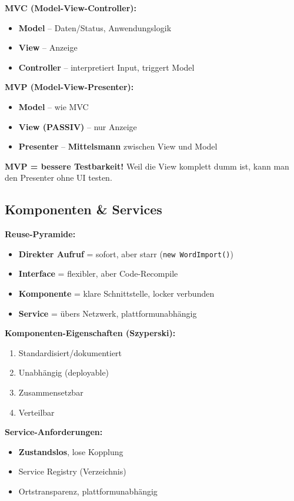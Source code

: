 \documentclass[11pt,a4paper]{article}
\begin{document}
\begin{keyfacts}
\textbf{MVC (Model-View-Controller):}
\begin{itemize}
  \item \textbf{Model} -- Daten/Status, Anwendungslogik
  \item \textbf{View} -- Anzeige
  \item \textbf{Controller} -- interpretiert Input, triggert Model
\end{itemize}

\textbf{MVP (Model-View-Presenter):}
\begin{itemize}
  \item \textbf{Model} -- wie MVC
  \item \textbf{View (PASSIV)} -- nur Anzeige
  \item \textbf{Presenter} -- \textbf{Mittelsmann} zwischen View und Model
\end{itemize}
\end{keyfacts}

\begin{merkhilfe}
\textbf{MVP = bessere Testbarkeit!} Weil die View komplett dumm ist, kann man den Presenter ohne UI testen.
\end{merkhilfe}

\subsection{Komponenten \& Services}

\begin{story}
\textbf{Reuse-Pyramide:}
\begin{itemize}
  \item \textbf{Direkter Aufruf} = sofort, aber starr (\texttt{new WordImport()})
  \item \textbf{Interface} = flexibler, aber Code-Recompile
  \item \textbf{Komponente} = klare Schnittstelle, locker verbunden
  \item \textbf{Service} = übers Netzwerk, plattformunabhängig
\end{itemize}
\end{story}

\begin{keyfacts}
\textbf{Komponenten-Eigenschaften (Szyperski):}
\begin{enumerate}
  \item Standardisiert/dokumentiert
  \item Unabhängig (deployable)
  \item Zusammensetzbar
  \item Verteilbar
\end{enumerate}

\textbf{Service-Anforderungen:}
\begin{itemize}
  \item \textbf{Zustandslos}, lose Kopplung
  \item Service Registry (Verzeichnis)
  \item Ortstransparenz, plattformunabhängig
\end{itemize}
\end{keyfacts}
\end{document}
